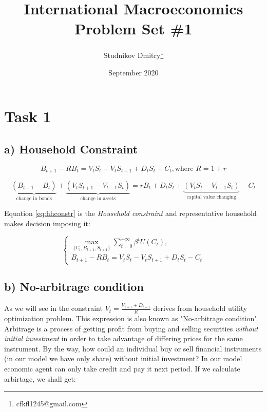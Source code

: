 \documentclass{article}
\title{International Macroeconomics \\ Problem Set \#1}
\author{Studnikov Dmitry\thanks{cfkfl1245@gmail.com}}
\date{September 2020}
\begin{document}
\maketitle

\section*{Task 1} \label{sec:sec1}

\subsection*{a) Household Constraint}

\begin{equation}
    B_{t+1} - RB_{t} = V_{t}S_{t} - V_{t}S_{t+1} +D_{t}S_{t} - C_{t}, \text{where } R = 1+r
\end{equation}

\begin{equation}
    \underbrace{(B_{t+1} - B_t)}_\text{change in bonds} + \underbrace{(V_{t}S_{t+1} - V_{t-1}S_{t})}_\text{change in assets} = rB_t + D_{t}S_{t} + \underbrace{(V_{t}S_{t} - V_{t-1}S_{t})}_\text{capital value changing} - C_t
    \label{eq:hhconstr}
\end{equation}

Equation \ref{eq:hhconstr} is the \textit{Household constraint} and representative household makes decision imposing it:

\begin{equation}
    \begin{cases}
        \max\limits_{\{C_{t}, B_{t+1}, S_{t+1}\}} \sum_{t = 0} ^ {+\infty}\beta^{t}U(C_t), \\
        B_{t+1} - RB_{t} = V_{t}S_{t} - V_{t}S_{t+1} +D_{t}S_{t} - C_{t}
    \end{cases}
\end{equation}

\subsection*{b) No-arbitrage condition} \label{subsec:b}

As we will see in  the constraint $V_t = \frac{V_{t+1}+D_{t+1}}{R}$ derives from household utility optimization problem. This expression is also known as "No-arbitrage condition". Arbitrage is a process of getting profit from buying and selling securities \textit{without initial investment} in order to take advantage of differing prices for the same instrument. By the way, how could an individual buy or sell financial instruments (in our model we have only share) without initial investment? In our model economic agent can only take credit and pay it next period. If we calculate arbirtage, we shall get:
\end{document}
